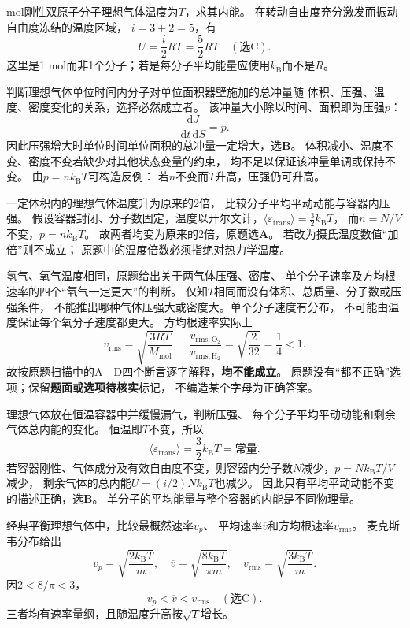  mol刚性双原子分子理想气体温度为$T$，求其内能。
\workings
在转动自由度充分激发而振动自由度冻结的温度区域，
$i=3+2=5$，有
\[
\boxed{U=\frac{i}{2}RT=\frac52RT}\quad(\text{选C}).
\]
\crosscheck 这里是1 mol而非1个分子；若是每分子平均能量应使用$k_{\mathrm B}$而不是$R$。

\problemtext 判断理想气体单位时间内分子对单位面积器壁施加的总冲量随
体积、压强、温度、密度变化的关系，选择必然成立者。
\workings
该冲量大小除以时间、面积即为压强$p$：
\[
\boxed{\frac{\mathrm dJ}{\mathrm dt\,\mathrm dS}=p}.
\]
因此压强增大时单位时间单位面积的总冲量一定增大，选\textbf{B}。
体积减小、温度不变、密度不变若缺少对其他状态变量的约束，
均不足以保证该冲量单调或保持不变。
\crosscheck 由$p=nk_{\mathrm B}T$可构造反例：
若$n$不变而$T$升高，压强仍可升高。

\problemtext 一定体积内的理想气体温度升为原来的2倍，
比较分子平均平动动能与容器内压强。
\workings
假设容器封闭、分子数固定，温度以开尔文计，$\langle\varepsilon_{\mathrm{trans}}\rangle=\tfrac32 k_{\mathrm B}T$，
而$n=N/V$不变，$p=nk_{\mathrm B}T$。
故两者均变为原来的2倍，原题选\textbf{A}。
\crosscheck 若改为摄氏温度数值“加倍”则不成立；
原题中的温度倍数必须指绝对热力学温度。

\problemtext 氢气、氧气温度相同，原题给出关于两气体压强、密度、
单个分子速率及方均根速率的四个“氧气一定更大”的判断。
\workings
仅知$T$相同而没有体积、总质量、分子数或压强条件，
不能推出哪种气体压强大或密度大。单个分子速度有分布，
不可能由温度保证每个氧分子速度都更大。
方均根速率实际上
\[
v_{\mathrm{rms}}=\sqrt{\frac{3RT}{M_{\mathrm{mol}}}},
\quad
\frac{v_{\mathrm{rms,O_2}}}{v_{\mathrm{rms,H_2}}}
=\sqrt{\frac{2}{32}}=\frac14<1.
\]
故按原题扫描中的A—D四个断言逐字解释，\textbf{均不能成立}。
\crosscheck 原题没有“都不正确”选项；保留\textbf{题面或选项待核实}标记，
不编造某个字母为正确答案。

\problemtext 理想气体放在恒温容器中并缓慢漏气，判断压强、
每个分子平均平动动能和剩余气体总内能的变化。
\workings
恒温即$T$不变，所以
\[
\boxed{\langle\varepsilon_{\mathrm{trans}}\rangle
=\frac32k_{\mathrm B}T=\text{常量}}.
\]
若容器刚性、气体成分及有效自由度不变，则容器内分子数$N$减少，$p=Nk_{\mathrm B}T/V$减少，
剩余气体的总内能$U=(i/2)Nk_{\mathrm B}T$也减少。
因此只有平均平动动能不变的描述正确，选\textbf{B}。
\crosscheck 单分子的平均能量与整个容器的内能是不同物理量。

\problemtext 经典平衡理想气体中，比较最概然速率$v_p$、
平均速率$\overline v$和方均根速率$v_{\mathrm{rms}}$。
\workings
麦克斯韦分布给出
\[
v_p=\sqrt{\frac{2k_{\mathrm B}T}{m}},\quad
\overline v=\sqrt{\frac{8k_{\mathrm B}T}{\pi m}},\quad
v_{\mathrm{rms}}=\sqrt{\frac{3k_{\mathrm B}T}{m}}.
\]
因$2<8/\pi<3$，
\[
\boxed{v_p<\overline v<v_{\mathrm{rms}}}\quad(\text{选C}).
\]
\crosscheck 三者均有速率量纲，且随温度升高按$\sqrt T$增长。

